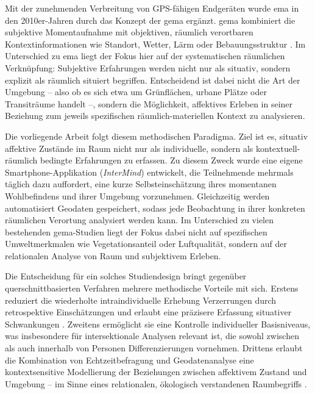 Mit der zunehmenden Verbreitung von GPS-fähigen Endgeräten wurde \acrshort{ema} in den 2010er-Jahren durch das Konzept der \acrfull{gema} ergänzt. \acrshort{gema} kombiniert die subjektive Momentaufnahme mit objektiven, räumlich verortbaren Kontextinformationen wie Standort, Wetter, Lärm oder Bebauungsstruktur \parencite{kirchnerSpatiotemporalDeterminantsMental2016}. Im Unterschied zu \acrshort{ema} liegt der Fokus hier auf der systematischen räumlichen Verknüpfung: Subjektive Erfahrungen werden nicht nur als situativ, sondern explizit als räumlich situiert begriffen. Entscheidend ist dabei nicht die Art der Umgebung – also ob es sich etwa um Grünflächen, urbane Plätze oder Transiträume handelt –, sondern die Möglichkeit, affektives Erleben in seiner Beziehung zum jeweils spezifischen räumlich-materiellen Kontext zu analysieren.

Die vorliegende Arbeit folgt diesem methodischen Paradigma. Ziel ist es, situativ affektive Zustände im Raum nicht nur als individuelle, sondern als kontextuell-räumlich bedingte Erfahrungen zu erfassen. Zu diesem Zweck wurde eine eigene Smartphone-Applikation (\textit{InterMind}) entwickelt, die Teilnehmende mehrmals täglich dazu auffordert, eine kurze Selbsteinschätzung ihres momentanen Wohlbefindens und ihrer Umgebung vorzunehmen. Gleichzeitig werden automatisiert Geodaten gespeichert, sodass jede Beobachtung in ihrer konkreten räumlichen Verortung analysiert werden kann. Im Unterschied zu vielen bestehenden \acrshort{gema}-Studien liegt der Fokus dabei nicht auf spezifischen Umweltmerkmalen wie Vegetationsanteil oder Luftqualität, sondern auf der relationalen Analyse von Raum und subjektivem Erleben.

Die Entscheidung für ein solches Studiendesign bringt gegenüber querschnittbasierten Verfahren mehrere methodische Vorteile mit sich. Erstens reduziert die wiederholte intraindividuelle Erhebung Verzerrungen durch retrospektive Einschätzungen und erlaubt eine präzisere Erfassung situativer Schwankungen \parencite{randallDevelopmentTrialMobile2013}. Zweitens ermöglicht sie eine Kontrolle individueller Basisniveaus, was insbesondere für intersektionale Analysen relevant ist, die sowohl zwischen als auch innerhalb von Personen Differenzierungen vornehmen. Drittens erlaubt die Kombination von Echtzeitbefragung und Geodatenanalyse eine kontextsensitive Modellierung der Beziehungen zwischen affektivem Zustand und Umgebung – im Sinne eines relationalen, ökologisch verstandenen Raumbegriffs \parencite{mascherekMeadowsAsphaltRoad2025}.


